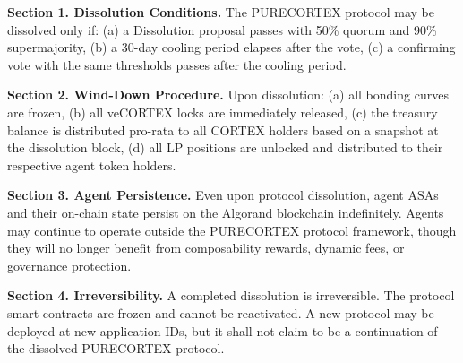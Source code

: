 \textbf{Section 1. Dissolution Conditions.} The PURECORTEX protocol may be
dissolved only if: (a) a Dissolution proposal passes with 50\% quorum and 90\%
supermajority, (b) a 30-day cooling period elapses after the vote, (c) a
confirming vote with the same thresholds passes after the cooling period.

\textbf{Section 2. Wind-Down Procedure.} Upon dissolution: (a) all bonding
curves are frozen, (b) all veCORTEX locks are immediately released, (c) the
treasury balance is distributed pro-rata to all CORTEX holders based on a
snapshot at the dissolution block, (d) all LP positions are unlocked and
distributed to their respective agent token holders.

\textbf{Section 3. Agent Persistence.} Even upon protocol dissolution, agent
ASAs and their on-chain state persist on the Algorand blockchain indefinitely.
Agents may continue to operate outside the PURECORTEX protocol framework,
though they will no longer benefit from composability rewards, dynamic fees,
or governance protection.

\textbf{Section 4. Irreversibility.} A completed dissolution is irreversible.
The protocol smart contracts are frozen and cannot be reactivated. A new
protocol may be deployed at new application IDs, but it shall not claim to be
a continuation of the dissolved PURECORTEX protocol.
